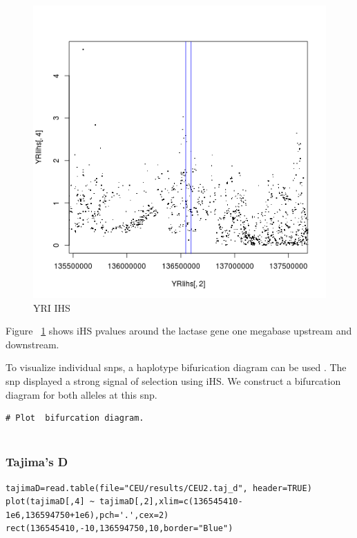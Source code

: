\begin{figure}
\centering
\includegraphics{pictures/YRIihs.png}
\caption{YRI IHS}
\label{fig:yriihs}
\end{figure}

Figure ~\ref{fig:yriihs} shows iHS pvalues around the lactase gene one megabase upstream and downstream.

To visualize individual snps, a haplotype bifurication diagram can be used \citep{Gautier:2012et}. The snp displayed a strong signal of selection using iHS. We construct a bifurcation diagram for both alleles at this snp. \\
\begin{verbatim}
# Plot  bifurcation diagram.


\end{verbatim}
\subsubsection{Tajima's D}

\begin{verbatim}
tajimaD=read.table(file="CEU/results/CEU2.taj_d", header=TRUE)
plot(tajimaD[,4] ~ tajimaD[,2],xlim=c(136545410-1e6,136594750+1e6),pch='.',cex=2)
rect(136545410,-10,136594750,10,border="Blue") 
\end{verbatim}

